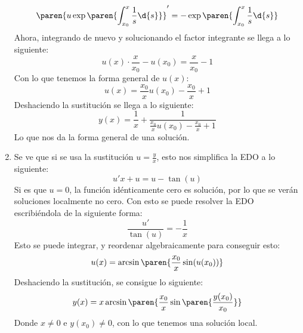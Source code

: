\documentclass{homework}
\begin{document}
\begin{sol}
\begin{enumerate}
        \begin{equation*}
            \paren{u\exp\paren{\int_{x_0}^x\frac1s\d{s}}}'=-\exp\paren{\int_{x_0}^x\frac1s\d{s}}
        \end{equation*}
        Ahora, integrando de nuevo y solucionando el factor integrante se llega a lo siguiente:
        \begin{equation*}
            u(x)\cdot\frac{x}{x_0}-u(x_0)=\frac{x}{x_0}-1
        \end{equation*}
        Con lo que tenemos la forma general de \(u(x)\):
        \begin{equation*}
            u(x)=\frac{x_0}xu(x_0)-\frac{x_0}x+1
        \end{equation*}
        Deshaciendo la sustitución se llega a lo siguiente:
        \begin{equation*}
            y(x)=\frac1x+\frac1{\frac{x_0}xu(x_0)-\frac{x_0}x+1}
        \end{equation*}
        Lo que nos da la forma general de una solución.
        \item Se ve que si se usa la sustitución \(u=\frac{y}{x}\), esto nos simplifica la EDO a lo siguiente:
        \begin{equation*}
            u'x+u=u-\tan(u)
        \end{equation*}
        Si es que \(u=0\), la función idénticamente cero es solución, por lo que se verán soluciones localmente no cero. Con esto se puede resolver la EDO escribiéndola de la siguiente forma:
        \begin{equation*}
            \frac{u'}{\tan(u)}=-\frac1x
        \end{equation*}
        Esto se puede integrar, y reordenar algebraicamente para conseguir esto:
        \begin{equation*}
            u(x)=\arcsin\paren{\frac{x_0}x\sin(u(x_0))}
        \end{equation*}
        Deshaciendo la sustitución, se consigue lo siguiente:
        \begin{equation*}
            y(x)=x\arcsin\paren{\frac{x_0}x\sin\paren{\frac{y(x_0)}{x_0}}}
        \end{equation*}
        Donde \(x\neq0\) e \(y(x_0)\neq0\), con lo que tenemos una solución local.
    \end{enumerate}
\end{sol}
\end{document}
